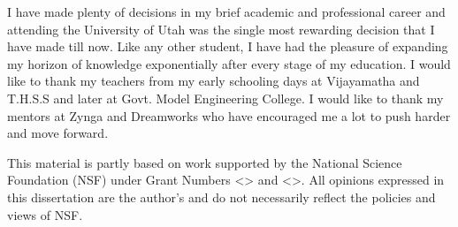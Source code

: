 I have made plenty of decisions in my brief academic and professional career and attending the University of Utah was the single most rewarding decision that I have made till now. Like any other student, I have had the pleasure of expanding my horizon of knowledge exponentially after every stage of my education. I would like to thank my teachers from my early schooling days at Vijayamatha and  T.H.S.S and later at Govt. Model Engineering College. I would like to thank my mentors at Zynga and Dreamworks who have encouraged me a lot to push harder and move forward.

This material is partly based on work supported by the National Science Foundation (NSF)  under Grant Numbers <> and <>. All opinions expressed in this dissertation are the author’s and do not necessarily reflect the policies and views of NSF.